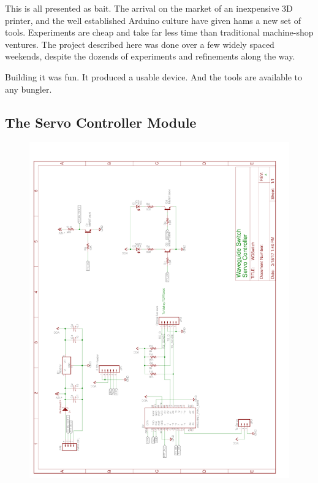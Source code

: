 \documentclass[12pt]{article}
\begin{document}
This is all presented as bait.  The arrival on the market of
an inexpensive 3D printer, and the well established Arduino
culture have given hams a new set of tools.  Experiments are
cheap and take far less time than traditional machine-shop
ventures. The project described here was done over a few
widely spaced weekends, despite the dozends of experiments
and refinements along the way.

Building it was fun. It produced a usable device. And the
tools are available to any bungler.

\clearpage

\begin{appendices}

\section{\label{a_controller_module}The Servo Controller Module}
\begin{figure}[h] 
  \centering
  \includegraphics[width=0.75\linewidth,keepaspectratio]{WGSwitch.pdf}
\end{figure} 
\clearpage

\end{appendices}
\end{document}

